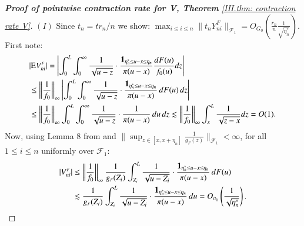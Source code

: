\begin{proof}[\hypertarget{III.proof contraction pointwise V}{\textbf{Proof of pointwise contraction rate for V, Theorem} \ref{III.thm: contraction rate V}}]
    $(I)$ Since $t_n = t r_n / n$ we show: $\max_{i \leq i \leq n} \| t_n Y_{ni}^{\scriptscriptstyle{F}} \|_{\mathcal{F}_1} = O_{\scriptscriptstyle{G_0}} \left( \frac{r_n}{n} \frac{1}{\sqrt{\eta^*_n}} \right)$. First note:
    \begin{align*}
    &|\mathrm{E} V_{ni}^{\scriptscriptstyle{F}}| = \left| \int_0^L \int_0^\infty \frac{1}{\sqrt{u-z}} \cdot \frac{\mathbf{1}_{\eta_n^* \leq u - x \leq \eta_n}}{\pi(u-x)}  \frac{dF(u)}{f_0(u)} dz \right| \\
    &\leq \left\| \frac{1}{f_0} \right\|_\infty \left| \int_0^L \int_0^\infty \frac{1}{\sqrt{u-z}} \cdot \frac{\mathbf{1}_{\eta_n^* \leq u - x \leq \eta_n}}{\pi(u-x)}  \, dF(u) \, dz \right|  \\
    &\leq \left\| \frac{1}{f_0} \right\|_\infty \int_0^L \int_0^\infty \frac{1}{\sqrt{u-z}} \cdot \frac{1}{\pi(u-x)} \, du \, dz \lesssim \left\| \frac{1}{f_0} \right\|_\infty \int_x^L \frac{1}{\sqrt{z-x}} dz = O(1).
    \end{align*}
    Now, using Lemma 8 from \cite{27} and $ \| \sup_{z \in [x, x + \eta_n]} \frac{1}{g_{\scriptscriptstyle{F}}(z)} \|_{\mathcal{F}_1}< \infty$, for all $1 \leq i \leq n$ uniformly over $\mathcal{F}_1$:
    \begin{align*}
        |V_{ni}^{\scriptscriptstyle{F}}| &\leq \left\| \frac{1}{f_0} \right\|_\infty \frac{1}{g_{\scriptscriptstyle{F}}(Z_i)} \int_{Z_i}^L \frac{1}{\sqrt{u-Z_i}} \cdot \frac{\mathbf{1}_{\eta_n^* \leq u - x \leq \eta_n}}{\pi(u-x)}  \, dF(u) \\
        &\lesssim \frac{1}{g_{\scriptscriptstyle{F}}(Z_i)} \int_{Z_i}^L \frac{1}{\sqrt{u-Z_i}} \cdot \frac{\mathbf{1}_{\eta_n^* \leq u - x \leq \eta_n}}{\pi(u-x)} \, du = O_{\scriptscriptstyle{G_0}} \left( \frac{1}{\sqrt{\eta^*_n}} \right).
    \end{align*}
    


\end{proof}
